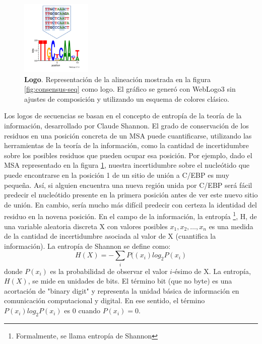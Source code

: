 \begin{figure}[htbp]
\centering
\includegraphics[width = 0.3\textwidth]{figs/logo.png}
\caption{\textbf{Logo}. Representación de la alineación mostrada en la figura \ref{fig:consensus-seq} como logo. El gráfico se generó con WebLogo3 sin ajustes de composición y utilizando un esquema de colores clásico.}
\label{fig:logo}
\end{figure}

Los logos de secuencias se basan en el concepto de entropía de la teoría de la información, desarrollado por Claude Shannon. El grado de conservación de los residuos en una posición concreta de un MSA puede cuantificarse, utilizando las herramientas de la teoría de la información, como la cantidad de incertidumbre sobre los posibles residuos que pueden ocupar esa posición. Por ejemplo, dado el MSA representado en la figura \ref{fig:logo}, nuestra incertidumbre sobre el nucleótido que puede encontrarse en la posición 1 de un sitio de unión a C/EBP es muy pequeña. Así, si alguien encuentra una nueva región unida por C/EBP será fácil predecir el nucleótido presente en la primera posición antes de ver este nuevo sitio de unión. En cambio, sería mucho más difícil predecir con certeza la identidad del residuo en la novena posición. En el campo de la información, la entropía \footnote{Formalmente, se llama entropía de Shannon}, H, de una variable aleatoria discreta X con valores posibles $x_1, x_2, \ldots ,x_n$ es una medida de la cantidad de incertidumbre asociada al valor de X (cuantifica la información). La entropía de Shannon se define como:
$$H(X) = -\sum_i P((x_i) log_2 P(x_i)$$
donde $P(x_i)$ es la probabilidad de observar el valor $i$-ésimo de X. La entropía, $H(X)$, se mide en unidades de bits. El término bit (que no byte) es una acortación de "binary digit" y representa la unidad básica de información en comunicación computacional y digital. En ese sentido, el término $P(x_i) log_2 P(x_i)$ es 0 cuando $P(x_i) = 0$.

